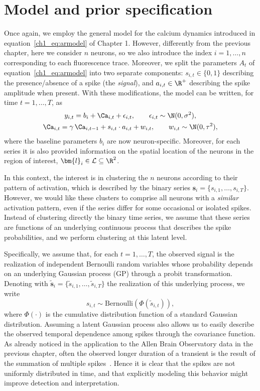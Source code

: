 \section{Model and prior specification}
Once again, we employ the general model for the calcium dynamics introduced in equation~\eqref{ch1_eq:armodel} of Chapter 1. However, differently from the previous chapter, here we consider $n$ neurons, so we also introduce the index $i=1,\dots,n$ corresponding to each fluorescence trace. 
Moreover, we split the parameters $A_t$ of equation~\eqref{ch1_eq:armodel} into two separate components: $s_{i,t}\in\{0,1\}$ describing the presence/absence of a spike (the \textit{signal}), and $a_{i,t}\in\R^+$ describing the spike amplitude when present.
With these modifications, the model can be written, for time $t=1,\dots,T$, as
\begin{equation}
\begin{gathered}
y_{i,t} = b_i + \Ca_{i,t} + \epsilon_{i,t},\qquad \epsilon_{i,t} \sim \N(0,\sigma^2),  \\
\Ca_{i,t} = \gamma\, \Ca_{i,t-1} + s_{i,t}\cdot a_{i,t} + w_{i,t}, \qquad w_{i,t} \sim \N(0, \tau^2),
\end{gathered}
\label{ch4_eq:armodel_mult}
\end{equation}
where the baseline parameters $b_i$ are now neuron-specific.
Moreover, for each series it is also provided information on the spatial location of the neurons in the region of interest, $\bm{l}_i \in \mathcal{L}\subseteq\R^2$.

In this context, the interest is in clustering the $n$ neurons according to their pattern of activation, which is described by the binary series $\bm{s}_i = \{s_{i,1},\dots,s_{i,T}\}$. However, we would like these clusters to comprise all neurons with a \textit{similar} activation pattern, even if the series differ for some occasional or isolated spikes. Instead of clustering directly the binary time series, we assume that these series are functions of an underlying continuous process that describes the spike probabilities, and we perform clustering at this latent level.

Specifically, we assume that, for each $t=1,\dots,T$, the observed signal is the realization of independent Bernoulli random variables whose probability depends on an underlying Gaussian process (GP) through a probit transformation. Denoting with $\tilde{\bm{s}}_i = \{\tilde{s}_{i,1},\dots,\tilde{s}_{i,T}\}$ the realization of this underlying process, we write
\begin{equation*}
s_{i,t} \sim \mathrm{Bernoulli}(\Phi(\tilde{s}_{i,t})),
\end{equation*}
where $\Phi(\cdot)$ is the cumulative distribution function of a standard Gaussian distribution.
Assuming a latent Gaussian process also allows us to easily describe the observed temporal dependence among spikes through the covariance function. As already noticed in the application to the Allen Brain Observatory data in the previous chapter, often the observed longer duration of a transient is the result of the summation of multiple spikes~\parencite{dombeck2010}. Hence it is clear that the spikes are not uniformly distributed in time, and that explicitly modeling this behavior might improve detection and interpretation.

